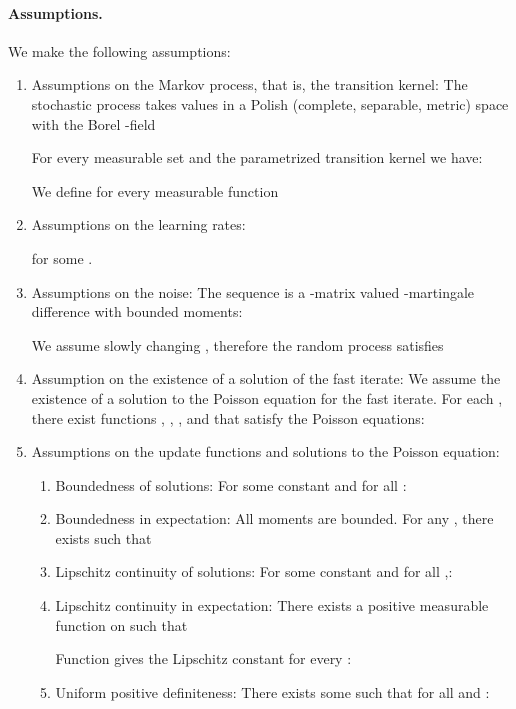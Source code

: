 \documentclass{article}
\begin{document}
\paragraph{Assumptions.}
We make the following assumptions:
\begin{enumerate}[label=\textbf{(A\arabic*)}]
\item Assumptions on the Markov process, that is, the transition kernel:
The stochastic process  takes values
in a Polish (complete, separable, metric) space 
with the Borel -field

For every measurable set  and the parametrized transition kernel
 we have:

We define for every measurable function 


\item
Assumptions on the learning rates:

for some .


\item Assumptions on the noise:
The sequence  is a -matrix valued
-martingale difference with bounded moments:


We assume slowly changing , therefore the random process 
satisfies


\item Assumption on the existence of a solution of the fast iterate:
We assume the existence of a solution to the Poisson equation for
the fast iterate.
For each , there exist functions
, ,
,
and  that satisfy
the Poisson equations:


\item Assumptions on the update functions and solutions to the Poisson
equation:

\begin{enumerate}
\item Boundedness of solutions: For some constant  and for all :

\item Boundedness in expectation: All moments are bounded. For any
  , there exists  such that

\item Lipschitz continuity of solutions:
For some constant  and for all ,:



\item Lipschitz continuity in expectation:
There exists a positive measurable function  on  such that

Function  gives the Lipschitz constant for every :


\item Uniform positive definiteness:
There exists some  such that for all  and :

\end{enumerate}

\end{enumerate}
\end{document}
